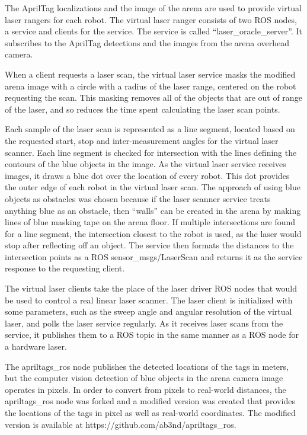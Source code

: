 \documentclass[]{article}
\begin{document}
The AprilTag localizations and the image of the arena are used to provide virtual laser rangers for each robot. 
The virtual laser ranger consists of two ROS nodes, a service and clients for the service. 
The service is called ``laser\_oracle\_server''. 
It subscribes to the AprilTag detections and the images from the arena overhead camera. 
 
When a client requests a laser scan, the virtual laser service masks the modified arena image with a circle with a radius of the laser range, centered on the robot requesting the scan.
This masking removes all of the objects that are out of range of the laser, and so reduces the time spent calculating the laser scan points. 

Each sample of the laser scan is represented as a line segment, located based on the requested start, stop and inter-measurement angles for the virtual laser scanner. 
Each line segment is checked for intersection with the lines defining the contours of the blue objects in the image. 
As the virtual laser service receives images, it draws a blue dot over the location of every robot. 
This dot provides the outer edge of each robot in the virtual laser scan. 
The approach of using blue objects as obstacles was chosen because if the laser scanner service treats anything blue as an obstacle, then ``walls'' can be created in the arena by making lines of blue masking tape on the arena floor. 
If multiple intersections are found for a line segment, the intersection closest to the robot is used, as the laser would stop after reflecting off an object.
The service then formats the distances to the intersection points as a ROS sensor\_msgs/LaserScan and returns it as the service response to the requesting client. 

The virtual laser clients take the place of the laser driver ROS nodes that would be used to control a real linear laser scanner. 
The laser client is initialized with some parameters, such as the sweep angle and angular resolution of the virtual laser, and polls the laser service regularly. 
As it receives laser scans from the service, it publishes them to a ROS topic in the same manner as a ROS node for a hardware laser. 

The apriltags\_ros node publishes the detected locations of the tags in meters, but the computer vision detection of blue objects in the arena camera image operates in pixels. 
In order to convert from pixels to real-world distances, the apriltags\_ros node was forked and a modified version was created that provides the locations of the tags in pixel as well as real-world coordinates. 
The modified version is available at https://github.com/ab3nd/apriltags\_ros.
\end{document}
